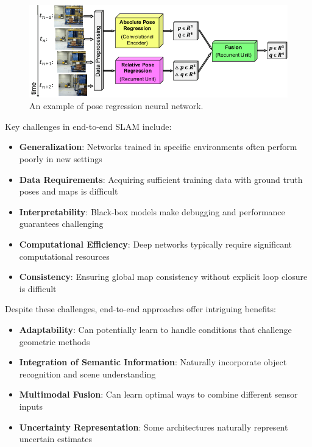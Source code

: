 \documentclass[12pt]{article}
\begin{document}
    
    \newpage
    \begin{figure}[h!]
        \centering
        \includegraphics[width=1.0\textwidth]{pose_regression.png}
        \caption{An example of pose regression neural network. \cite{pose_regression_img}}
        \label{fig:pose_regression}
    \end{figure}

    Key challenges in end-to-end SLAM include:
    
    \begin{itemize}
        \item \textbf{Generalization}: Networks trained in specific environments often perform poorly in new settings
        \item \textbf{Data Requirements}: Acquiring sufficient training data with ground truth poses and maps is difficult
        \item \textbf{Interpretability}: Black-box models make debugging and performance guarantees challenging
        \item \textbf{Computational Efficiency}: Deep networks typically require significant computational resources
        \item \textbf{Consistency}: Ensuring global map consistency without explicit loop closure is difficult
    \end{itemize}
    
    Despite these challenges, end-to-end approaches offer intriguing benefits:
    
    \begin{itemize}
        \item \textbf{Adaptability}: Can potentially learn to handle conditions that challenge geometric methods
        \item \textbf{Integration of Semantic Information}: Naturally incorporate object recognition and scene understanding
        \item \textbf{Multimodal Fusion}: Can learn optimal ways to combine different sensor inputs
        \item \textbf{Uncertainty Representation}: Some architectures naturally represent uncertain estimates
    \end{itemize}
    
\end{document}
